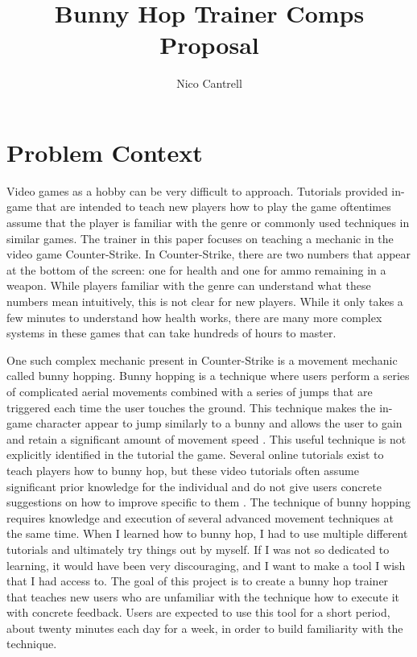 \documentclass[10pt,twocolumn]{article}
\title{Bunny Hop Trainer Comps Proposal}
\author{Nico Cantrell}
\affiliation{Occidental College}
\begin{document}
\maketitle
\section{Problem Context}
Video games as a hobby can be very difficult to approach. Tutorials provided in-game that are intended to teach new players how to play the game oftentimes assume that the player is familiar with the genre or commonly used techniques in similar games. The trainer in this paper focuses on teaching a mechanic in the video game Counter-Strike. In Counter-Strike, there are two numbers that appear at the bottom of the screen: one for health and one for ammo remaining in a weapon. While players familiar with the genre can understand what these numbers mean intuitively, this is not clear for new players. While it only takes a few minutes to understand how health works, there are many more complex systems in these games that can take hundreds of hours to master. 

One such complex mechanic present in Counter-Strike is a movement mechanic called bunny hopping. Bunny hopping is a technique where users perform a series of complicated aerial movements combined with a series of jumps that are triggered each time the user touches the ground. This technique makes the in-game character appear to jump similarly to a bunny and allows the user to gain and retain a significant amount of movement speed \cite{BunnyHoppingProgrammers}. This useful technique is not explicitly identified in the tutorial the game. Several online tutorials exist to teach players how to bunny hop, but these video tutorials often assume significant prior knowledge for the individual and do not give users concrete suggestions on how to improve specific to them \cite{QuakeBHopTutorial}. The technique of bunny hopping requires knowledge and execution of several advanced movement techniques at the same time. When I learned how to bunny hop, I had to use multiple different tutorials and ultimately try things out by myself. If I was not so dedicated to learning, it would have been very discouraging, and I want to make a tool I wish that I had access to. The goal of this project is to create a bunny hop trainer that teaches new users who are unfamiliar with the technique how to execute it with concrete feedback. Users are expected to use this tool for a short period, about twenty minutes each day for a week, in order to build familiarity with the technique.
\end{document}
